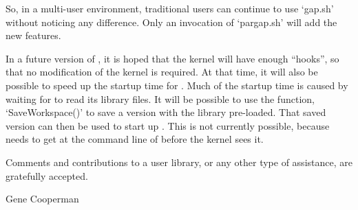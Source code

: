 So, in a multi-user environment, traditional users can  continue  to  use
`gap.sh'  without  noticing  any  difference.  Only  an   invocation   of
`pargap.sh' will add the new features.

In a future version of {\GAP}, it is hoped that the  {\GAP}  kernel  will
have enough ``hooks'', so that no modification of the  {\GAP}  kernel  is
required. At that time, it will also be possible to speed up the  startup
time for {\ParGAP}. Much of the startup time is  caused  by  waiting  for
{\GAP} to read its library files. It will be possible to use  the  {\GAP}
function, `SaveWorkspace()' to save a version  with  the  {\GAP}  library
pre-loaded. That saved version can then be used to  start  up  {\ParGAP}.
This is not currently possible, because {\ParGAP} needs  to  get  at  the
command line of {\GAP} before the {\GAP} kernel sees it.

Comments and contributions to a {\ParGAP} user library, or any other type
of assistance, are gratefully accepted.


Gene Cooperman

